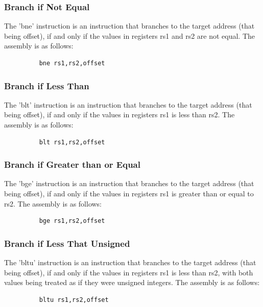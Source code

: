 \documentclass{article}
\begin{document}
\subsubsection{Branch if Not Equal}
\qquad
The 'bne' instruction is an instruction that branches to the target address (that being offset), if and only if the values in registers rs1 and rs2 are not equal. The assembly is as follows:
\begin{figure}[!htbp]
    \centering
    \begin{verbatim}
    bne rs1,rs2,offset
    \end{verbatim}
\end{figure}\newline

\subsubsection{Branch if Less Than}
\qquad
The 'blt' instruction is an instruction that branches to the target address (that being offset), if and only if the values in registers rs1 is less than rs2. The assembly is as follows:
\begin{figure}[!htbp]
    \centering
    \begin{verbatim}
    blt rs1,rs2,offset
    \end{verbatim}
\end{figure}\newline

\subsubsection{Branch if Greater than or Equal}
\qquad
The 'bge' instruction is an instruction that branches to the target address (that being offset), if and only if the values in registers rs1 is greater than or equal to rs2. The assembly is as follows:
\begin{figure}[!htbp]
    \centering
    \begin{verbatim}
    bge rs1,rs2,offset
    \end{verbatim}
\end{figure}\newline

\subsubsection{Branch if Less That Unsigned}
\qquad
The 'bltu' instruction is an instruction that branches to the target address (that being offset), if and only if the values in registers rs1 is less than rs2, with both values being treated as if they were unsigned integers. The assembly is as follows:
\begin{figure}[!htbp]
    \centering
    \begin{verbatim}
    bltu rs1,rs2,offset
    \end{verbatim}
\end{figure}\newline
\end{document}
